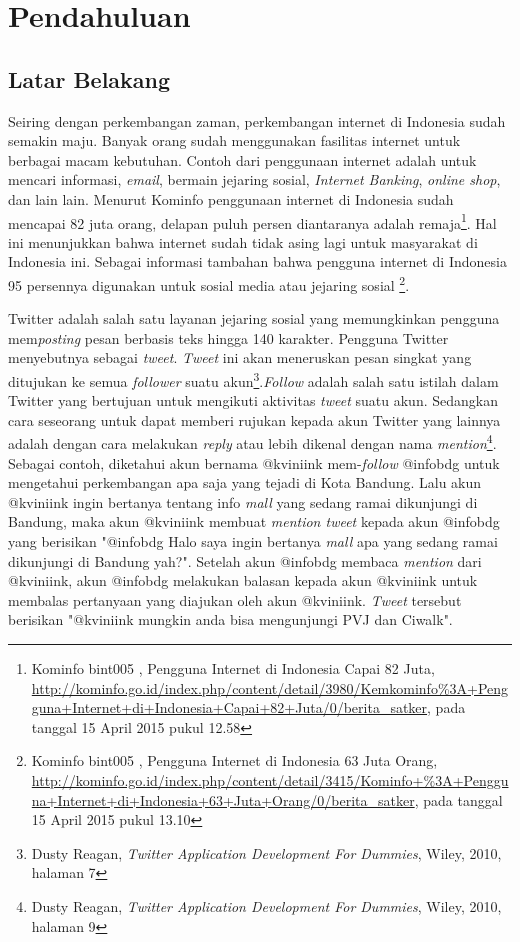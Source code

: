 \chapter{Pendahuluan}
\label{chap:pendahuluan}

\section{Latar Belakang}
\label{sec:latar belakang}

Seiring dengan perkembangan zaman, perkembangan internet di Indonesia sudah semakin maju.  Banyak orang sudah menggunakan fasilitas internet untuk berbagai macam kebutuhan. Contoh dari penggunaan internet adalah untuk mencari informasi, \textit{email}, bermain jejaring sosial, \textit{Internet Banking}, \textit{online shop}, dan lain lain. Menurut Kominfo penggunaan internet di Indonesia sudah mencapai 82 juta orang, delapan puluh persen diantaranya adalah remaja\footnote{Kominfo bint005 , Pengguna Internet di Indonesia Capai 82 Juta, \url{http://kominfo.go.id/index.php/content/detail/3980/Kemkominfo\%3A+Pengguna+Internet+di+Indonesia+Capai+82+Juta/0/berita_satker}, pada tanggal 15 April 2015 pukul 12.58}. Hal ini menunjukkan bahwa internet sudah tidak asing lagi untuk masyarakat di Indonesia ini. Sebagai informasi tambahan bahwa pengguna internet di Indonesia 95 persennya digunakan untuk sosial media atau jejaring sosial \footnote{Kominfo bint005 , Pengguna Internet di Indonesia 63 Juta Orang, \url{http://kominfo.go.id/index.php/content/detail/3415/Kominfo+\%3A+Pengguna+Internet+di+Indonesia+63+Juta+Orang/0/berita_satker}, pada tanggal 15 April 2015 pukul 13.10}.

Twitter adalah salah satu layanan jejaring sosial yang memungkinkan pengguna mem\textit{posting} pesan berbasis teks hingga 140 karakter. Pengguna Twitter menyebutnya sebagai \textit{tweet}. \textit{Tweet} ini akan meneruskan pesan singkat yang ditujukan ke semua \textit{follower} suatu akun\footnote{Dusty Reagan, \textit{Twitter Application Development For Dummies}, Wiley, 2010, halaman 7}.\textit{Follow} adalah salah satu istilah dalam Twitter yang bertujuan untuk mengikuti aktivitas \textit{tweet} suatu akun. Sedangkan cara seseorang untuk dapat memberi rujukan kepada akun Twitter yang lainnya adalah dengan cara melakukan \textit{reply} atau lebih dikenal dengan nama \textit{mention}\footnote{Dusty Reagan, \textit{Twitter Application Development For Dummies}, Wiley, 2010, halaman 9}. Sebagai contoh, diketahui akun bernama @kviniink mem-\textit{follow} @infobdg untuk mengetahui perkembangan apa saja yang tejadi di Kota Bandung. Lalu akun @kviniink ingin bertanya tentang info \textit{mall} yang sedang ramai dikunjungi di Bandung, maka akun @kviniink membuat \textit{mention tweet} kepada akun @infobdg yang berisikan "@infobdg Halo saya ingin bertanya \textit{mall} apa yang sedang ramai dikunjungi di Bandung yah?". Setelah akun @infobdg membaca \textit{mention} dari @kviniink, akun @infobdg melakukan balasan kepada akun @kviniink untuk membalas pertanyaan yang diajukan oleh akun @kviniink. \textit{Tweet} tersebut berisikan "@kviniink mungkin anda bisa mengunjungi PVJ dan Ciwalk".


